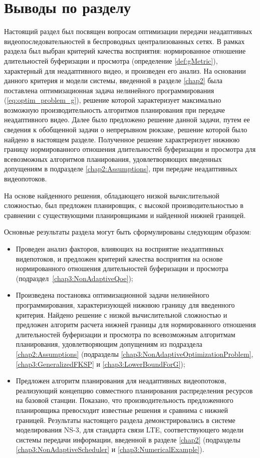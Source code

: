 \section{Выводы по разделу}

Настоящий раздел был посвящен вопросам оптимизации передачи неадаптивных видеопоследовательностей в беспроводных централизованных сетях. В рамках раздела был выбран критерий качества восприятия: нормированное отношение длительностей буферизации и просмотра (определение \ref{def:gMetric}), характерный для неадаптивного видео, и произведен его анализ. На основании данного критерия и модели системы, введенной в разделе \ref{chap2} была поставлена оптимизационная задача нелинейного программирования (\ref{eq:optim_problem_g}), решение которой характеризует максимально возможную производительность алгоритмов планирования при передаче неадаптивного видео. Далее было предложено решение данной задачи, путем ее сведения к обобщенной задачи о непрерывном рюкзаке, решение которой было найдено в настоящем разделе. Полученное решение характреризует нижнюю границу нормированного отношения длительностей буферизации и просмотра для всевозможных алгоритмов планирования, удовлетворяющих введенных допущениям в подразделе \ref{chap2:Assumptions}, при передаче неадаптивных видеопотоков.

На основе найденного решения, обладающего низкой вычислительной сложностью, был предложен планировщик, с высокой производительностью в сравнении с существующими планировщиками и найденной нижней границей.

Основные результаты раздела могут быть сформулированы следующим образом:
\begin{itemize}
	\item Проведен анализ факторов, влияющих на восприятие неадаптивных видепотоков, и предложен критерий качества восприятия на основе нормированного отношения длительностей буферизации и просмотра (подраздел~\ref{chap3:NonAdaptiveQoe});
	\item Произведена постановка оптимизационной задачи нелинейного программирования, характеризующей нижнюю границу для введенного критерия. Найдено решение с низкой вычислительной сложностью и предложен алгоритм расчета нижней границы для нормированного отношения длительностей буферизации и просмотра по всевозможным алгоритмам планирования, удовлетворяющим допущениям из подраздела \ref{chap2:Assumptions} (подразделы \ref{chap3:NonAdaptiveOptimizationProblem}, \ref{chap3:GeneralizedFKSP} и \ref{chap3:LowerBoundForG});
	\item Предложен алгоритм планирования для неадаптивных видеопотоков, реализующий концепцию совместного планирования распределения ресурсов на базовой станции. Показано, что производительность предложенного планировщика превосходит известные решения и сравнима с нижней границей. Результаты настоящего раздела демонстрировались в системе моделирования NS-3, для стандарта связи LTE, соответствующего модели системы передачи информации, введенной в разделе \ref{chap2} (подразделы \ref{chap3:NonAdaptiveScheduler} и \ref{chap3:NumericalExample}).
\end{itemize}
